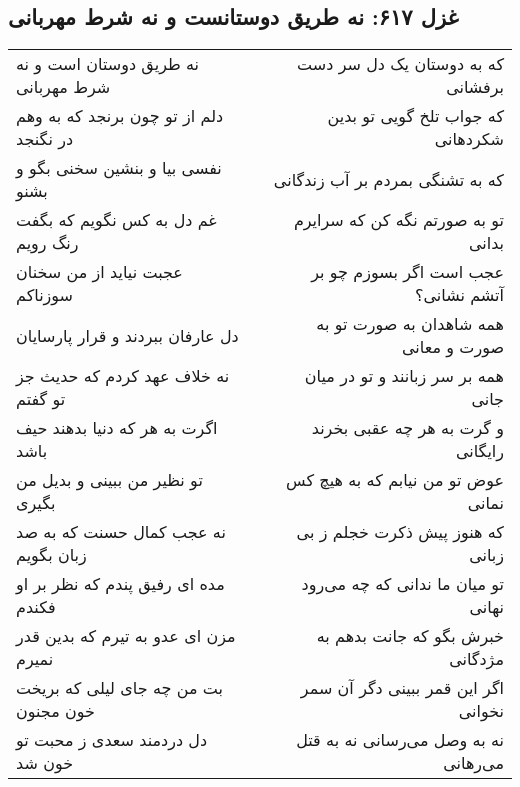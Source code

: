 \begin{center}
\section*{غزل ۶۱۷: نه طریق دوستانست و نه شرط مهربانی}
\label{sec:617}
\begin{longtable}{l p{0.5cm} r}
نه طریق دوستان است و نه شرط مهربانی
&&
که به دوستان یک دل سر دست برفشانی
\\
دلم از تو چون برنجد که به وهم در نگنجد
&&
که جواب تلخ گویی تو بدین شکردهانی
\\
نفسی بیا و بنشین سخنی بگو و بشنو
&&
که به تشنگی بمردم بر آب زندگانی
\\
غم دل به کس نگویم که بگفت رنگ رویم
&&
تو به صورتم نگه کن که سرایرم بدانی
\\
عجبت نیاید از من سخنان سوزناکم
&&
عجب است اگر بسوزم چو بر آتشم نشانی؟
\\
دل عارفان ببردند و قرار پارسایان
&&
همه شاهدان به صورت تو به صورت و معانی
\\
نه خلاف عهد کردم که حدیث جز تو گفتم
&&
همه بر سر زبانند و تو در میان جانی
\\
اگرت به هر که دنیا بدهند حیف باشد
&&
و گرت به هر چه عقبی بخرند رایگانی
\\
تو نظیر من ببینی و بدیل من بگیری
&&
عوض تو من نیابم که به هیچ کس نمانی
\\
نه عجب کمال حسنت که به صد زبان بگویم
&&
که هنوز پیش ذکرت خجلم ز بی زبانی
\\
مده ای رفیق پندم که نظر بر او فکندم
&&
تو میان ما ندانی که چه می‌رود نهانی
\\
مزن ای عدو به تیرم که بدین قدر نمیرم
&&
خبرش بگو که جانت بدهم به مژدگانی
\\
بت من چه جای لیلی که بریخت خون مجنون
&&
اگر این قمر ببینی دگر آن سمر نخوانی
\\
دل دردمند سعدی ز محبت تو خون شد
&&
نه به وصل می‌رسانی نه به قتل می‌رهانی
\\
\end{longtable}
\end{center}
